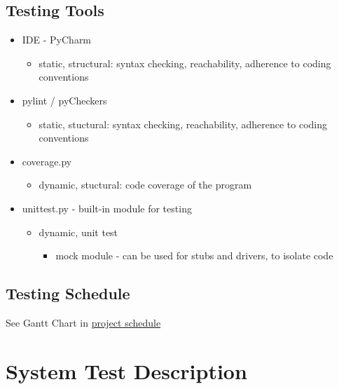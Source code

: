 \documentclass[12pt, titlepage]{article}
\begin{document}
	\subsection{Testing Tools}
	\begin{itemize}
		\itemsep0em
		\item IDE - PyCharm
		\vspace{-3mm}
		\begin{itemize}
			\item static, structural: syntax checking, reachability, adherence 
			to coding conventions
		\end{itemize}
		\item pylint / pyCheckers
		\vspace{-3mm}
		\begin{itemize}
			\item static, stuctural: syntax checking, reachability, adherence 
			to coding conventions
		\end{itemize}
		\item coverage.py
		\vspace{-3mm}
		\begin{itemize}
			\item dynamic, stuctural: code coverage of the program
		\end{itemize}
		\item unittest.py - built-in module for testing
		\vspace{-3mm}
		\begin{itemize}
			\item dynamic, unit test
			\vspace{-2mm}
			\begin{itemize}
				\item mock module - can be used for stubs and drivers, to 
				isolate code
			\end{itemize}
		\end{itemize}
	\end{itemize}
		
	\subsection{Testing Schedule}
	
	See Gantt Chart in 
	\href{https://gitlab.cas.mcmaster.ca/premaa/pysol/tree/master/ProjectSchedule}
	 {project schedule} 
	\section{System Test Description}
	
\end{document}
